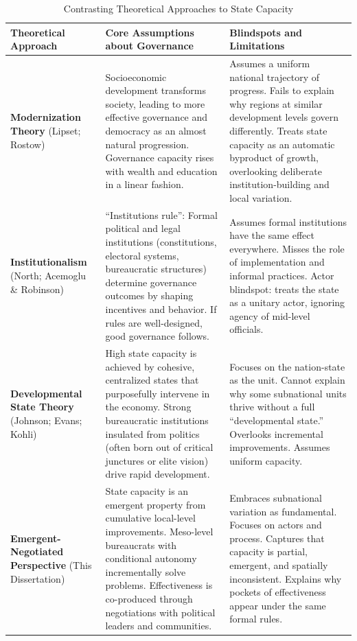 \begin{table}[H]
\centering
\caption{Contrasting Theoretical Approaches to State Capacity}
\small
\begin{tabularx}{\textwidth}{|p{3.5cm}|X|X|}
\hline
\textbf{Theoretical Approach} & \textbf{Core Assumptions about Governance} & \textbf{Blindspots and Limitations} \\
\hline

\textbf{Modernization Theory} \newline (Lipset; Rostow) & 
Socioeconomic development transforms society, leading to more effective governance and democracy as an almost natural progression. Governance capacity rises with wealth and education in a linear fashion. & 
Assumes a uniform national trajectory of progress. Fails to explain why regions at similar development levels govern differently. Treats state capacity as an automatic byproduct of growth, overlooking deliberate institution-building and local variation. \\
\hline

\textbf{Institutionalism} \newline (North; Acemoglu \& Robinson) & 
“Institutions rule”: Formal political and legal institutions (constitutions, electoral systems, bureaucratic structures) determine governance outcomes by shaping incentives and behavior. If rules are well-designed, good governance follows. & 
Assumes formal institutions have the same effect everywhere. Misses the role of implementation and informal practices. Actor blindspot: treats the state as a unitary actor, ignoring agency of mid-level officials. \\
\hline

\textbf{Developmental State Theory} \newline (Johnson; Evans; Kohli) & 
High state capacity is achieved by cohesive, centralized states that purposefully intervene in the economy. Strong bureaucratic institutions insulated from politics (often born out of critical junctures or elite vision) drive rapid development. & 
Focuses on the nation-state as the unit. Cannot explain why some subnational units thrive without a full “developmental state.” Overlooks incremental improvements. Assumes uniform capacity. \\
\hline

\textbf{Emergent-Negotiated Perspective} \newline (This Dissertation) & 
State capacity is an emergent property from cumulative local-level improvements. Meso-level bureaucrats with conditional autonomy incrementally solve problems. Effectiveness is co-produced through negotiations with political leaders and communities. & 
Embraces subnational variation as fundamental. Focuses on actors and process. Captures that capacity is partial, emergent, and spatially inconsistent. Explains why pockets of effectiveness appear under the same formal rules. \\
\hline

\end{tabularx}
\label{tab:theoretical-approaches}
\end{table}

